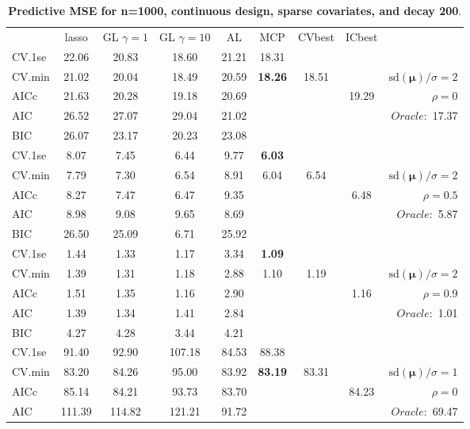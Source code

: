 \begin{table}\vspace{-.5cm}
\caption[l]{ { \bf Predictive MSE for n=1000, continuous design, 
sparse covariates, and  decay  200}.}
\vspace{-.5cm}
\footnotesize{}
\begin{center}
\begin{tabular}{l*{7}{c}|r}
 & lasso & GL $\gamma=1$ & GL $\gamma=10$ & AL & MCP  & CVbest & ICbest  \\
\cline{1-9}
CV.1se & 22.06 & 20.83 & 18.60 & 21.21 & 18.31 & & & \\
CV.min & 21.02 & 20.04 & 18.49 & 20.59 & {\bf 18.26} & 18.51 & & $\mathrm{sd}(\mathbf{\mu})/\sigma=2$ \\
AICc & 21.63 & 20.28 & 19.18 & 20.69 & & & 19.29 &  $\rho=0$ \\
AIC & 26.52 & 27.07 & 29.04 & 21.02 & & & &  \multirow{2}{*}{$Oracle: $ 17.37} \\
BIC & 26.07 & 23.17 & 20.23 & 23.08 & & & &  \\
 \hline 
CV.1se & 8.07 & 7.45 & 6.44 & 9.77 & {\bf 6.03} & & & \\
CV.min & 7.79 & 7.30 & 6.54 & 8.91 & 6.04 & 6.54 & & $\mathrm{sd}(\mathbf{\mu})/\sigma=2$ \\
AICc & 8.27 & 7.47 & 6.47 & 9.35 & & & 6.48 &  $\rho=0.5$ \\
AIC & 8.98 & 9.08 & 9.65 & 8.69 & & & &  \multirow{2}{*}{$Oracle: $ 5.87} \\
BIC & 26.50 & 25.09 & 6.71 & 25.92 & & & &  \\
 \hline 
CV.1se & 1.44 & 1.33 & 1.17 & 3.34 & {\bf 1.09} & & & \\
CV.min & 1.39 & 1.31 & 1.18 & 2.88 & 1.10 & 1.19 & & $\mathrm{sd}(\mathbf{\mu})/\sigma=2$ \\
AICc & 1.51 & 1.35 & 1.16 & 2.90 & & & 1.16 &  $\rho=0.9$ \\
AIC & 1.39 & 1.34 & 1.41 & 2.84 & & & &  \multirow{2}{*}{$Oracle: $ 1.01} \\
BIC & 4.27 & 4.28 & 3.44 & 4.21 & & & &  \\
 \hline 
CV.1se & 91.40 & 92.90 & 107.18 & 84.53 & 88.38 & & & \\
CV.min & 83.20 & 84.26 & 95.00 & 83.92 & {\bf 83.19} & 83.31 & & $\mathrm{sd}(\mathbf{\mu})/\sigma=1$ \\
AICc & 85.14 & 84.21 & 93.73 & 83.70 & & & 84.23 &  $\rho=0$ \\
AIC & 111.39 & 114.82 & 121.21 & 91.72 & & & &  \multirow{2}{*}{$Oracle: $ 69.47} \\

\end{tabular}
\end{center}
\end{table}
